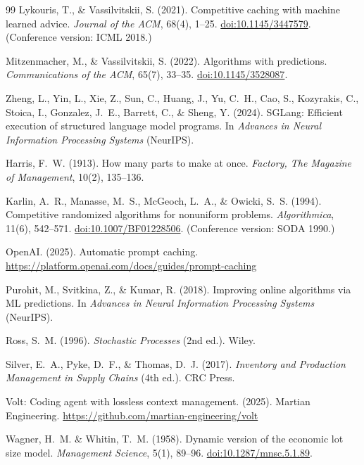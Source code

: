 \documentclass[11pt]{article}
\theoremstyle{definition}
\theoremstyle{remark}
\begin{document}
\begin{thebibliography}{99}
Lykouris, T., \& Vassilvitskii, S. (2021).
Competitive caching with machine learned advice.
\emph{Journal of the ACM}, 68(4), 1--25.
\href{https://doi.org/10.1145/3447579}{doi:10.1145/3447579}.
(Conference version: ICML 2018.)

Mitzenmacher, M., \& Vassilvitskii, S. (2022).
Algorithms with predictions.
\emph{Communications of the ACM}, 65(7), 33--35.
\href{https://doi.org/10.1145/3528087}{doi:10.1145/3528087}.

Zheng, L., Yin, L., Xie, Z., Sun, C., Huang, J., Yu, C.~H., Cao, S., Kozyrakis, C., Stoica, I., Gonzalez, J.~E., Barrett, C., \& Sheng, Y. (2024).
SGLang: Efficient execution of structured language model programs.
In \emph{Advances in Neural Information Processing Systems} (NeurIPS).

Harris, F.~W. (1913).
How many parts to make at once.
\emph{Factory, The Magazine of Management}, 10(2), 135--136.

Karlin, A.~R., Manasse, M.~S., McGeoch, L.~A., \& Owicki, S.~S. (1994).
Competitive randomized algorithms for nonuniform problems.
\emph{Algorithmica}, 11(6), 542--571.
\href{https://doi.org/10.1007/BF01228506}{doi:10.1007/BF01228506}.
(Conference version: SODA 1990.)

OpenAI. (2025).
Automatic prompt caching.
\url{https://platform.openai.com/docs/guides/prompt-caching}

Purohit, M., Svitkina, Z., \& Kumar, R. (2018).
Improving online algorithms via ML predictions.
In \emph{Advances in Neural Information Processing Systems} (NeurIPS).

Ross, S.~M. (1996).
\emph{Stochastic Processes} (2nd ed.). Wiley.

Silver, E.~A., Pyke, D.~F., \& Thomas, D.~J. (2017).
\emph{Inventory and Production Management in Supply Chains} (4th ed.). CRC Press.

Volt: Coding agent with lossless context management. (2025).
Martian Engineering.
\url{https://github.com/martian-engineering/volt}

Wagner, H.~M. \& Whitin, T.~M. (1958).
Dynamic version of the economic lot size model.
\emph{Management Science}, 5(1), 89--96.
\href{https://doi.org/10.1287/mnsc.5.1.89}{doi:10.1287/mnsc.5.1.89}.


\end{thebibliography}
\end{document}
